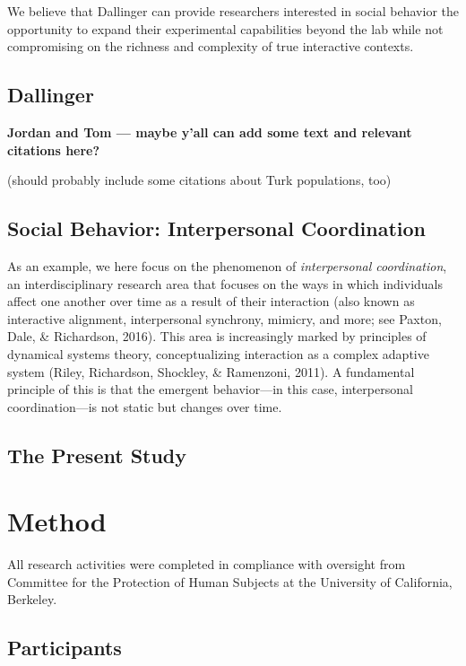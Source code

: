 \documentclass[10pt, letterpaper]{article}
\begin{document}
We believe that Dallinger can provide researchers interested in social
behavior the opportunity to expand their experimental capabilities
beyond the lab while not compromising on the richness and complexity of
true interactive contexts.

\subsection{Dallinger}\label{dallinger}

\textbf{Jordan and Tom --- maybe y'all can add some text and relevant
citations here?}

(should probably include some citations about Turk populations, too)

\subsection{Social Behavior: Interpersonal
Coordination}\label{social-behavior-interpersonal-coordination}

As an example, we here focus on the phenomenon of \emph{interpersonal
coordination}, an interdisciplinary research area that focuses on the
ways in which individuals affect one another over time as a result of
their interaction (also known as interactive alignment, interpersonal
synchrony, mimicry, and more; see Paxton, Dale, \& Richardson, 2016).
This area is increasingly marked by principles of dynamical systems
theory, conceptualizing interaction as a complex adaptive system (Riley,
Richardson, Shockley, \& Ramenzoni, 2011). A fundamental principle of
this is that the emergent behavior---in this case, interpersonal
coordination---is not static but changes over time.

\subsection{The Present Study}\label{the-present-study}

\section{Method}\label{method}

All research activities were completed in compliance with oversight from
Committee for the Protection of Human Subjects at the University of
California, Berkeley.

\subsection{Participants}\label{participants}
\end{document}
